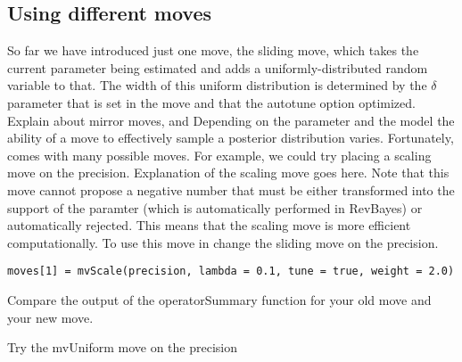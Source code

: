 \begin{figure}[h!]
\label{fig:ScalePriors}
\end{figure}

\subsection{Using different moves}

So far we have introduced just one move, the sliding move, which takes the current parameter being estimated and adds a uniformly-distributed random variable to that. The width of this uniform distribution is determined by the $\delta$ parameter that is set in the move and that the autotune option optimized. Explain about mirror moves, and Depending on the parameter and the model the ability of a move to effectively sample a posterior distribution varies. Fortunately, \RevBayes comes with many possible moves. For example, we could try placing a scaling move on the precision. Explanation of the scaling move goes here. Note that this move cannot propose a negative number that must be either transformed into the support of the paramter (which is automatically performed in RevBayes) or automatically rejected. This means that the scaling move is more efficient computationally. To use this move in \RevBayes change the sliding move on the precision.

{\tt \begin{snugshade*}
 \begin{lstlisting}
moves[1] = mvScale(precision, lambda = 0.1, tune = true, weight = 2.0)
 \end{lstlisting}
\end{snugshade*}}

Compare the output of the operatorSummary function for your old move and your new move. 

Try the mvUniform move on the precision

